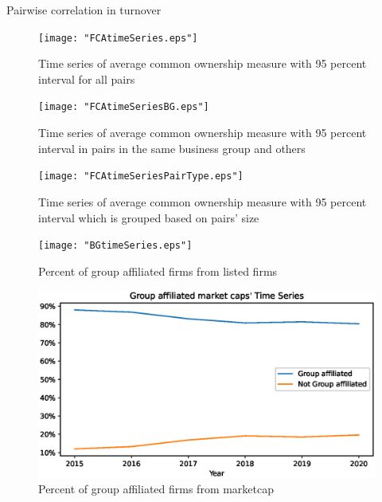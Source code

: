 \documentclass[12pt, a4paper]{article}
\begin{document}
\begin{table}[htbp]
	\centering
	\caption{Pairwise correlation in turnover  }
	\resizebox{0.7\textheight}{!}{
		\centering
		
	}
	\label{mresult2-turnover}
\end{table}

%		



\newpage
		\begin{figure}
	\centering  
	\caption{Time series of average common ownership measure with 95 percent interval for all pairs}
	\texttt{[image: "FCAtimeSeries.eps"]}
	
\end{figure} 

			\begin{figure}
	\centering  
	\caption{Time series of average common ownership measure with 95 percent interval in pairs in the same business group and others}
	\texttt{[image: "FCAtimeSeriesBG.eps"]}
\end{figure}    

\begin{figure}
	\centering  
	\caption{Time series of average common ownership measure with 95 percent interval which is grouped based on pairs' size}
	\texttt{[image: "FCAtimeSeriesPairType.eps"]}
\end{figure}




	\begin{figure}
	\centering  
	\caption{Percent of group affiliated firms from listed firms}
	\texttt{[image: "BGtimeSeries.eps"]}
	
\end{figure}  

\begin{figure}
	\centering  
	\caption{Percent of group affiliated firms from marketcap}
	\includegraphics[width=\linewidth]{"BGMarketCaptimeSeries.eps"}
	
\end{figure}
 
%
\end{document}
